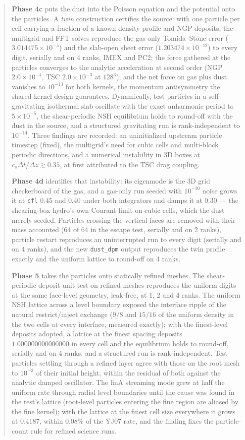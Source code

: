 \documentclass[11pt]{article}
\newcommand{\code}[1]{\texttt{#1}}
\begin{document}
\begin{abstract}
\textbf{Phase 4c} puts the dust into the Poisson equation and the potential onto the
particles. A \emph{twin} construction certifies the source: with one particle per cell
carrying a fraction of a known density profile and NGP deposits, the multigrid and FFT
solves reproduce the gas-only Tomida--Stone error ($3.014475\times10^{-5}$) and the
slab-open sheet error ($1.203474\times10^{-12}$) to every digit, serially and on 4
ranks, IMEX and PC2; the force gathered at the particles converges to the analytic
acceleration at second order (NGP $2.0\times10^{-4}$, TSC $2.0\times10^{-3}$ at $128^3$);
and the net force on gas plus dust vanishes to $10^{-13}$ for both kernels, the
momentum antisymmetry the shared-kernel design guarantees. Dynamically, test particles
in a self-gravitating isothermal slab oscillate with the exact anharmonic period to
$5\times10^{-5}$, the shear-periodic NSH equilibrium holds to round-off with the dust in
the source, and a structured gravitating run is rank-independent to $10^{-14}$. Three
findings are recorded: an uninitialized upstream particle timestep (fixed), the
multigrid's need for cubic cells and multi-block periodic directions, and a numerical
instability in 3D boxes at $c_s\Delta t/\Delta z \gtrsim 0.35$, at first attributed to
the TSC drag coupling.

\textbf{Phase 4d} identifies that instability: its eigenmode is the 3D grid checkerboard
of the gas, and a gas-only run seeded with $10^{-10}$ noise grows it at \code{cfl} $0.45$
and $0.40$ under both integrators and damps it at $0.30$ --- the shearing-box hydro's own
Courant limit on cubic cells, which the dust merely seeded. Particles crossing the
vertical faces are removed with their mass accounted (64 of 64 in the escape test,
serially and on 2 ranks), particle restart reproduces an uninterrupted run to every
digit (serially and on 4 ranks), and the new \code{dust\_dpm} output reproduces the twin
profile exactly and the uniform lattice to round-off on 4 ranks.

\textbf{Phase 5} takes the particles onto statically refined meshes. The shear-periodic
deposit unit test on refined meshes reproduces the uniform digits at the same face-level
geometry, leak-free, at 1, 2 and 4 ranks. The uniform NSH lattice across a level boundary
exposed the interface ripple of the natural restrict/inject exchange ($9/8$ and $15/16$ of
the uniform density in the two cells at every interface, measured exactly); with the
finest-level deposits adopted, a lattice at the finest spacing deposits $1.000000000000000$
in every cell and the equilibrium holds to round-off, serially and on 4 ranks, and a
structured run is rank-independent. Test particles settling through a refined layer agree
with those on the root mesh to $10^{-3}$ of their initial height, within the residual of
both against the analytic damped oscillator. The linA streaming mode grew at half the
uniform rate through radial level boundaries until the cause was found in the test's
lattice (root-level particles entering the fine region are aliased by the fine kernel);
with the lattice at the finest cell size everywhere it grows at $0.4187$, within $0.08\%$ of the YJ07
rate, and the finding fixes the particle-count rule for refined science runs.


\end{abstract}
\end{document}
